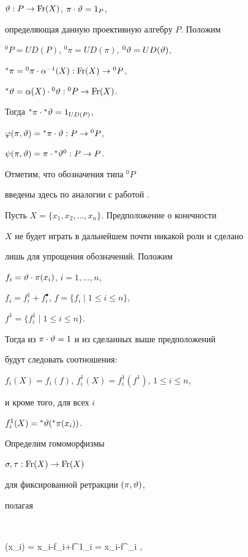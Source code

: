 $\vartheta : P \to \operatorname{Fr}(X)$, $\pi\cdot \vartheta=1_P $,


определяющая данную проективную алгебру $P$. Положим


${}^0 P=UD(P)$, ${}^0\pi=UD(\pi)$, ${}^0\vartheta=UD(\vartheta)$,


${}^\ast\pi={}^0\pi\cdot \alpha^{-1}(X):


\Fr(X) \to {}^0 P$,


${}^\ast\te= \alpha(X)\cdot {}^0\te:


{}^0 P \to \Fr(X)$.


Тогда ${}^\ast\pi\cdot {}^\ast\vartheta = 1_{UD(P)}$,


$\f(\pi,\te)= {}^\ast\pi\cdot\te : P


\to {}^0 P $,


$\psi(\pi,\vartheta)=\pi\cdot{}^{\ast}\vartheta {}^0 : P \to P$.


Отметим, что обозначения типа ${}^0 P$


введены здесь по аналогии с работой \cite{BCW}.





Пусть $X=\{x_1,x_2,\dotsc,x_n\}$. Предположение о конечности


$X$ не будет играть в дальнейшем почти никакой роли и сделано


лишь для упрощения обозначений. Положим


$f_i=\vartheta\cdot\pi(x_i)$, $i=1,\dotsc,n$,


$f_i=f^1_i+f^{\bullet}_i$, $f=\{f_i\mid 1\le i\le n\}$,


$f^1=\{f^1_i \mid 1\le i\le n\}$.


Тогда из $\pi\cdot\vartheta=1$ и из сделанных выше предположений


будут следовать соотношения:


$ f_i(X)=f_i(f)$, $f^1_i(X)=f^1_i(f^1)$, $1\le i\le n$,


и кроме того, для всех $i\;$


$f^1_i(X)={}^{\ast}\vartheta({}^\ast\pi(x_i))$.





Определим гомоморфизмы


$ \sigma, \tau : \operatorname{Fr}(X) \to \operatorname{Fr}(X)$


для фиксированной ретракции $(\pi,\vartheta)$,


полагая


$$


\tau(x_i) = x_i-f_i+f^1_i = x_i-f^{\bullet}_i \quad, 


